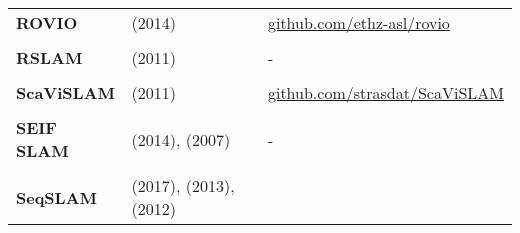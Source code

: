 \documentclass[a4paper,12pt]{scrartcl}
\begin{document}
{\begin{longtable}{l|l|l}
    \textbf{ROVIO}                                                                                                                & \cite{Bloesch2015} (2014)
                                                                                                                                  & {\href{https://github.com/ethz-asl/rovio}{github.com/ethz-asl/rovio}}                     \\
                                                                                                                                  &                                                                                            &   \\ [-3mm]
    \textbf{RSLAM}                                                                                                                & \cite{Mei2011} (2011)                                                                      & - \\
                                                                                                                                  &                                                                                            &   \\ [-3mm]
    \textbf{ScaViSLAM}                                                                                                            & \cite{Strasdat2011} (2011)
                                                                                                                                  & {\href{https://github.com/strasdat/ScaViSLAM}{github.com/strasdat/ScaViSLAM}}             \\
                                                                                                                                  &                                                                                            &   \\ [-3mm]
    \textbf{SEIF SLAM}                                                                                                            & \cite{Torres-Gonzalez2014} (2014), \cite{Walter2007} (2007)                                & - \\
                                                                                                                                  &                                                                                            &   \\ [-3mm]
    \textbf{SeqSLAM}                                                                                                              & \cite{bai2017} (2017), \cite{Sunderhauf2013} (2013), \cite{Milford2012} (2012)

\end{longtable}}
\end{document}
